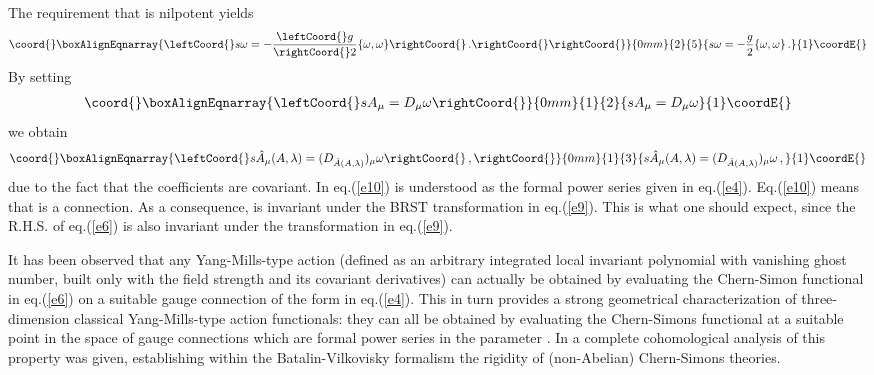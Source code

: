 \documentclass[a4paper,11pt]{article}
\begin{document}
The requirement that \coordHE{} is nilpotent yields
%
\begin{eqnarray}\coord{}\boxAlignEqnarray{\leftCoord{}
s \omega = -\frac{\leftCoord{}g}{\rightCoord{}2} \{ \omega,\omega \} \rightCoord{}\, . \rightCoord{}
\label{e9_1}
\rightCoord{}}{0mm}{2}{5}{
s \omega = -\frac{g}{2} \{ \omega,\omega \} \, . 
}{1}\coordE{}\end{eqnarray}
%
By setting
%
\begin{eqnarray}\coord{}\boxAlignEqnarray{\leftCoord{}
s A_\mu = D_\mu \omega 
\label{e9}
\rightCoord{}}{0mm}{1}{2}{
s A_\mu = D_\mu \omega 
}{1}\coordE{}\end{eqnarray}
%
we obtain
%
\begin{eqnarray}\coord{}\boxAlignEqnarray{\leftCoord{}
s \hat A_\mu (A,\lambda) = (D_{\hat A(A,\lambda)})_\mu \omega \rightCoord{}\, ,
\label{e10}
\rightCoord{}}{0mm}{1}{3}{
s \hat A_\mu (A,\lambda) = (D_{\hat A(A,\lambda)})_\mu \omega \, ,
}{1}\coordE{}\end{eqnarray}
%
due to the fact that the coefficients \coordHE{} are covariant.
In eq.(\ref{e10}) \coordHE{} is understood as the formal power series
given in eq.(\ref{e4}).
Eq.(\ref{e10}) means that \coordHE{} is a connection.
As a consequence, \coordHE{} is invariant under 
the BRST transformation in eq.(\ref{e9}).
This is what one should expect, since
the R.H.S. of eq.(\ref{e6}) is also
invariant under the transformation in eq.(\ref{e9}).

It has been observed \cite{sorella2,Barnich:vg} that any Yang-Mills-type
action (defined as an arbitrary integrated local invariant 
polynomial with vanishing ghost number, built only with the field
strength \coordHE{} and its covariant derivatives) can actually be obtained
by evaluating the Chern-Simon functional in eq.(\ref{e6})  on a suitable
gauge connection \coordHE{} of the form in eq.(\ref{e4}).
This in turn provides a strong geometrical characterization
\cite{sorella2} of
three-dimension classical Yang-Mills-type action functionals: they 
can all be obtained
by evaluating the Chern-Simons functional at a suitable point
in the space of gauge connections which are formal power series
in the parameter \myHighlight{$\lambda$}\coordHE{}.
In \cite{Barnich:vg} a complete cohomological analysis of this
property was given, establishing within the Batalin-Vilkovisky
formalism the rigidity of (non-Abelian) Chern-Simons theories.
\end{document}

